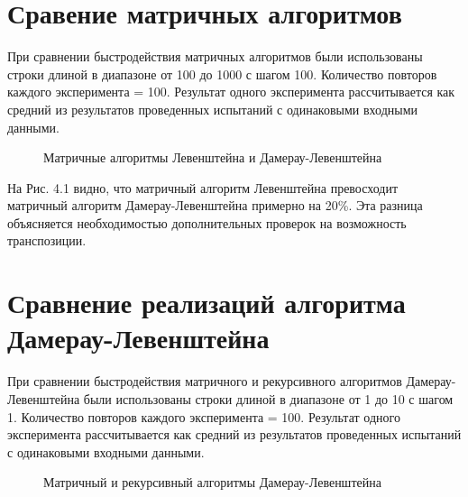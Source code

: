 \documentclass[a4paper,12pt]{report}
\begin{document}
\section{Сравение матричных алгоритмов}
\hspace{0.6cm}При сравнении быстродействия матричных алгоритмов были использованы строки длиной в диапазоне от 100 до 1000 с шагом 100. Количество повторов каждого эксперимента = 100. Результат одного эксперимента рассчитывается как средний из результатов проведенных испытаний с одинаковыми входными данными.

\begin{figure}[ht!]
\begin{center}
\caption{Матричные алгоритмы Левенштейна и Дамерау-Левенштейна}
\end{center}
\end{figure}

На Рис. 4.1 видно, что матричный алгоритм Левенштейна превосходит матричный алгоритм Дамерау-Левенштейна примерно на 20\%. Эта разница объясняется необходимостью дополнительных проверок на возможность транспозиции.

\section{Сравнение реализаций алгоритма Дамерау-Левенштейна}
\hspace{0.6cm}При сравнении быстродействия матричного и рекурсивного алгоритмов Дамерау-Левенштейна были использованы строки длиной в диапазоне от 1 до 10 с шагом 1. Количество повторов каждого эксперимента = 100. Результат одного эксперимента рассчитывается как средний из результатов проведенных испытаний с одинаковыми входными данными.
\begin{figure}[ht!]
\begin{center}
\caption{Матричный и рекурсивный алгоритмы Дамерау-Левенштейна}
\end{center}
\end{figure}
\end{document}
